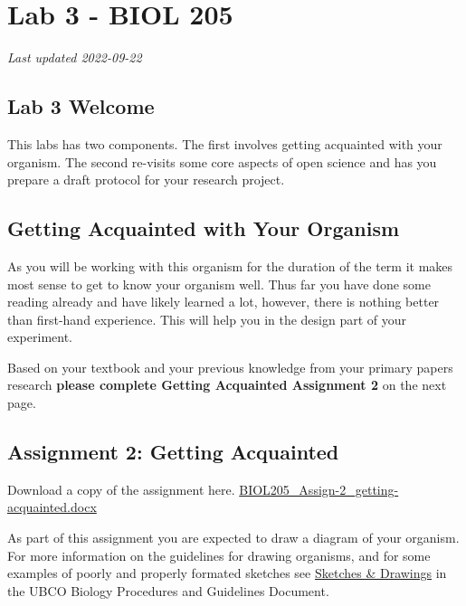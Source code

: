 \documentclass[
]{book}
\begin{document}
\hypertarget{part-lab-3---biol-205}{%
\part*{Lab 3 - BIOL 205}\label{part-lab-3---biol-205}}

\emph{Last updated 2022-09-22}

\hypertarget{lab-3-welcome}{%
\chapter*{Lab 3 Welcome}\label{lab-3-welcome}}

This labs has two components. The first involves getting acquainted with your organism. The second re-visits some core aspects of open science and has you prepare a draft protocol for your research project.

\hypertarget{getting-acquainted-with-your-organism}{%
\chapter*{Getting Acquainted with Your Organism}\label{getting-acquainted-with-your-organism}}

As you will be working with this organism for the duration of the term it makes most sense to get to know your organism well. Thus far you have done some reading already and have likely learned a lot, however, there is nothing better than first-hand experience. This will help you in the design part of your experiment.

Based on your textbook and your previous knowledge from your primary papers research \textbf{please complete Getting Acquainted Assignment 2} on the next page.

\hypertarget{assignment-2-getting-acquainted}{%
\chapter*{Assignment 2: Getting Acquainted}\label{assignment-2-getting-acquainted}}

Download a copy of the assignment here. \href{https://osf.io/download/xz2rk}{BIOL205\_Assign-2\_getting-acquainted.docx}

As part of this assignment you are expected to draw a diagram of your organism. For more information on the guidelines for drawing organisms, and for some examples of poorly and properly formated sketches see \href{https://ubco-biology.github.io/Procedures-and-Guidelines/sketches-drawings.html}{Sketches \& Drawings} in the UBCO Biology Procedures and Guidelines Document.
\end{document}
